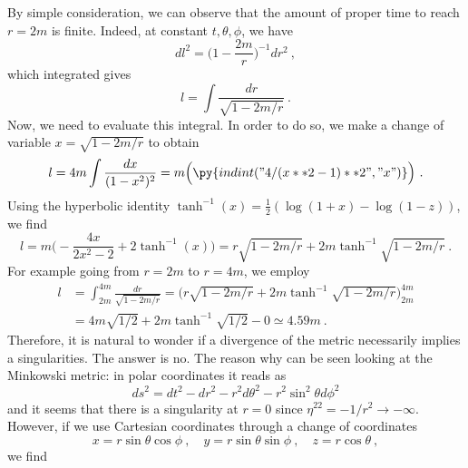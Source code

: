     By simple consideration, we can observe that the amount of proper time to reach $r = 2m$ is finite. Indeed, at constant $t, \theta, \phi$, we have 
    \begin{equation*}
        dl^2 = \Big ( 1 - \frac{2m}{r} \Big)^{-1} dr^2 ~,
    \end{equation*}
    which integrated gives 
    \begin{equation*}
        l = \int \frac{dr}{\sqrt{1 - 2 m / r}} ~.
    \end{equation*}
    Now, we need to evaluate this integral. In order to do so, we make a change of variable $x = \sqrt{1 - 2m / r}$ to obtain 
    \begin{equation*}
        l = 4 m \int \frac{d x}{(1-x^2)^2} = m \Big ( \py{indint("4 / (x**2 - 1)**2", "x")} \Big ) ~.
    \end{equation*}
    Using the hyperbolic identity $\tanh^{-1} (x) = \frac{1}{2} (\log(1+x) - \log(1-z))$, we find
    \begin{equation*}
        l = m \Big ( - \frac{4x}{2 x^2 - 2} + 2 \tanh^{-1} (x) \Big) = r \sqrt{1 - 2m / r} + 2 m \tanh^{-1} \sqrt{1 - 2m / r} ~.
    \end{equation*}
    For example going from $r = 2m$ to $r = 4m$, we employ
    \begin{equation*}
    \begin{aligned}
        l & = \int_{2m}^{4m} \frac{dr}{\sqrt{1 - 2 m /r}} = \Big ( r \sqrt{1 - 2m / r} + 2 m \tanh^{-1} \sqrt{1 - 2m / r} \Big)_{2m}^{4m} \\ & = 4m \sqrt{1/2} + 2 m \tanh^{-1} \sqrt{1/2} - 0 \simeq 4.59 m ~.
    \end{aligned}
    \end{equation*}
    Therefore, it is natural to wonder if a divergence of the metric necessarily implies a singularities. The answer is no. The reason why can be seen looking at the Minkowski metric: in polar coordinates it reads as 
    \begin{equation*}
        ds^2 = dt^2 - dr^2 - r^2 d\theta^2 - r^2 \sin^2 \theta d\phi^2
    \end{equation*}
    and it seems that there is a singularity at $r=0$ since $\eta^{22} = - 1 / r^2 \rightarrow - \infty$. However, if we use Cartesian coordinates through a change of coordinates 
    \begin{equation*}
        x = r \sin \theta \cos \phi ~, \quad y = r \sin \theta \sin \phi ~, \quad z = r \cos \theta ~,
    \end{equation*}
    we find
